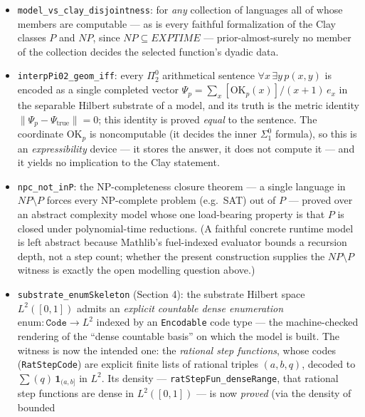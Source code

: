 \documentclass[11pt,a4paper]{report}
\begin{document}
\begin{itemize}
  circuit of at most \(50k + 50\) gates on the three \(k\)-bit dyadic
  inputs (a big-endian ripple comparator, built gate by gate with a
  machine-checked correctness proof).
\item
  \texttt{model\_vs\_clay\_disjointness}: for \emph{any} collection of
  languages all of whose members are computable --- as is every faithful
  formalization of the Clay classes \(P\) and \(NP\), since
  \(NP \subseteq EXPTIME\) --- prior-almost-surely no member of the
  collection decides the selected function's dyadic data.
\item
  \texttt{interpPi02\_geom\_iff}: every \(\Pi^0_2\) arithmetical sentence
  \(\forall x\,\exists y\,p(x,y)\) is encoded as a single completed vector
  \(\Psi_p = \sum_x [\mathrm{OK}_p(x)]/(x+1)\,e_x\) in the separable Hilbert
  substrate of a model, and its truth is the metric identity
  \(\lVert \Psi_p - \Psi_{\mathrm{true}}\rVert = 0\); this identity is proved
  \emph{equal} to the sentence. The coordinate \(\mathrm{OK}_p\) is
  noncomputable (it decides the inner \(\Sigma^0_1\) formula), so this is an
  \emph{expressibility} device --- it stores the answer, it does not compute it
  --- and it yields no implication to the Clay statement.
\item
  \texttt{npc\_not\_inP}: the NP-completeness closure theorem --- a single
  language in \(NP \setminus P\) forces every NP-complete problem (e.g.\ SAT)
  out of \(P\) --- proved over an abstract complexity model whose one
  load-bearing property is that \(P\) is closed under polynomial-time
  reductions. (A faithful concrete runtime model is left abstract because
  Mathlib's fuel-indexed evaluator bounds a recursion depth, not a step count;
  whether the present construction supplies the \(NP \setminus P\) witness is
  exactly the open modelling question above.)
\item
  \texttt{substrate\_enumSkeleton} (Section 4): the substrate Hilbert space
  \(L^{2}([0,1])\) admits an \emph{explicit countable dense enumeration}
  \(\mathrm{enum}\colon \texttt{Code} \to L^{2}\) indexed by an
  \texttt{Encodable} code type --- the machine-checked rendering of the
  ``dense countable basis'' on which the model is built. The witness is now the
  intended one: the \emph{rational step functions}, whose codes
  (\texttt{RatStepCode}) are explicit finite lists of rational triples
  \((a,b,q)\), decoded to \(\sum (q)\,\mathbf{1}_{(a,b]}\) in \(L^{2}\). Its
  density --- \texttt{ratStepFun\_denseRange}, that rational step functions are
  dense in \(L^{2}([0,1])\) --- is now \emph{proved} (via the density of bounded

\end{itemize}
\end{document}
